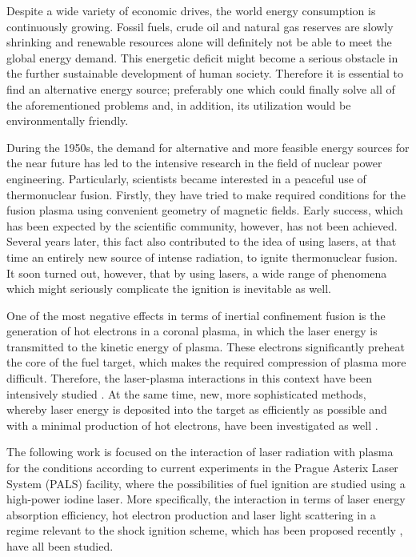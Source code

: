 Despite a wide variety of economic drives, the world energy consumption is continuously growing. Fossil fuels, crude oil and natural gas reserves are slowly shrinking and renewable resources alone will definitely not be able to meet the global energy demand. This energetic deficit might become a serious obstacle in the further sustainable development of human society. Therefore it is essential to find an alternative energy source; preferably one which could finally solve all of the aforementioned problems and, in addition, its utilization would be environmentally friendly.

During the 1950s, the demand for alternative and more feasible energy sources for the near future has led to the intensive research in the field of nuclear power engineering. Particularly, scientists became interested in a peaceful use of thermonuclear fusion. Firstly, they have tried to make required conditions for the fusion plasma using convenient geometry of magnetic fields. Early success, which has been expected by the scientific community, however, has not been achieved. Several years later, this fact also contributed to the idea of using lasers, at that time an entirely new source of intense radiation, to ignite thermonuclear fusion. It soon turned out, however, that by using lasers, a wide range of phenomena which might seriously complicate the ignition is inevitable as well.

One of the most negative effects in terms of inertial confinement fusion is the generation of hot electrons in a coronal plasma, in which the laser energy is transmitted to the kinetic energy of plasma. These electrons significantly preheat the core of the fuel target, which makes the required compression of plasma more difficult. Therefore, the laser-plasma interactions in this context have been intensively studied \cite{tikhonchuk}. At the same time, new, more sophisticated methods, whereby laser energy is deposited into the target as efficiently as possible and with a minimal production of hot electrons, have been investigated as well \cite{batani}.

The following work is focused on the interaction of laser radiation with plasma for the conditions according to current experiments in the Prague Asterix Laser System (PALS) facility, where the possibilities of fuel ignition are studied using a high-power iodine laser. More specifically, the interaction in terms of laser energy absorption efficiency, hot electron production and laser light scattering in a regime relevant to the shock ignition scheme, which has been proposed recently \cite{betti}, have all been studied.

